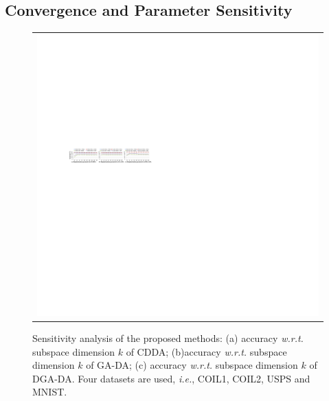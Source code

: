 \documentclass[journal,twocolumn]{IEEEtran}
\begin{document}
\begin{CJK*}{UTF8}{gkai}
\subsection{Convergence and Parameter Sensitivity }
\label{subsection: Convergence and Parameter Sensitivity}



\begin{figure}[h!]
		\begin{center}
			\begin{tabular}{c}
	\includegraphics[width=0.95\linewidth]{k.pdf}
			\end{tabular}
		\end{center}
        	\vspace{-10pt} 
		\caption {Sensitivity analysis of the proposed methods:  (a) accuracy \textit{w.r.t.} subspace dimension  $k$ of CDDA; (b)accuracy \textit{w.r.t.} subspace dimension $k$ of GA-DA;
(c) accuracy \textit{w.r.t.} subspace dimension $k$ of DGA-DA.
Four datasets are used, \textit{i.e.}, COIL1, COIL2, USPS and MNIST.} 
        		\label{fig:k}
	\end{figure} 



\end{CJK*}
\end{document}
